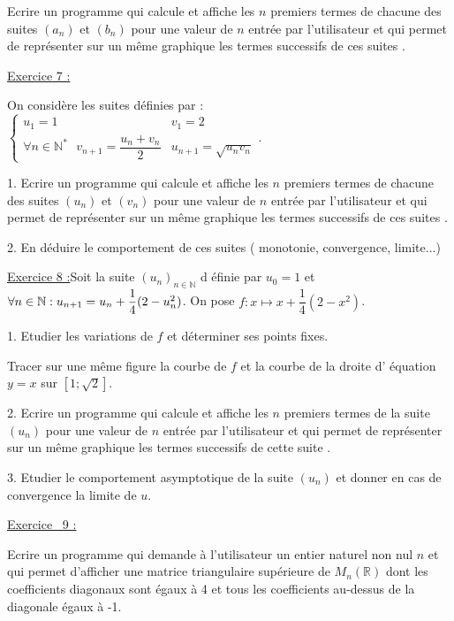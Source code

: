 \documentclass{article}
\begin{document}
Ecrire un programme qui calcule et affiche les $n$ premiers termes de
chacune des suites $\left( a_{n}\right) $ et $\left( b_{n}\right) $ pour une
valeur de $n$ entr\'{e}e par l'utilisateur et qui permet de repr\'{e}senter
sur un m\^{e}me graphique les termes successifs de ces suites .

\underline{Exercice 7 :}

On consid\`{e}re les suites d\'{e}finies par : $\left\{ 
\begin{array}{cc}
u_{1}=1 & v_{1}=2 \\ 
\forall n\in \mathbb{N}^{\ast }\text{ }v_{n+1}=\dfrac{u_{n}+v_{n}}{2} & 
u_{n+1}=\sqrt{u_{n}v_{n}}%
\end{array}%
\right. .$

1. Ecrire un programme qui calcule et affiche les $n$ premiers termes de
chacune des suites $\left( u_{n}\right) $ et $\left( v_{n}\right) $ pour une
valeur de $n$ entr\'{e}e par l'utilisateur et qui permet de repr\'{e}senter
sur un m\^{e}me graphique les termes successifs de ces suites .

2. En d\'{e}duire le comportement de ces suites ( monotonie, convergence,
limite...)

\bigskip

\bigskip \underline{Exercice 8 :}Soit la suite $(u_{n})_{n\in \mathbb{N}}$ d%
\'{e}finie par $u_{0}=1$ et $\forall n\in \mathbb{N}:u_{n+1}=u_{n}+\dfrac{1}{%
4}(2-u_{n}^{2})$. \newline
On pose $f:x\mapsto x+\dfrac{1}{4}(2-x^{2})$.\thinspace

1. Etudier les variations de $f$ et d\'{e}terminer ses points fixes.

Tracer sur une m\^{e}me figure la courbe de $f$ et la courbe de la droite d'%
\'{e}quation $y=x$ sur $\left[ 1;\sqrt{2}\right] .$

2. Ecrire un programme qui calcule et affiche les $n$ premiers termes de la
suite $\left( u_{n}\right) $ pour une valeur de $n$ entr\'{e}e par
l'utilisateur et qui permet de repr\'{e}senter sur un m\^{e}me graphique les
termes successifs de cette suite .

3. Etudier le comportement asymptotique de la suite $\left( u_{n}\right) $
et donner en cas de convergence la limite de $u.$

\underline{Exercice \ 9 :}

Ecrire un programme qui demande \`{a} l'utilisateur un entier naturel non
nul $n$ et qui permet d'afficher une matrice triangulaire sup\'{e}rieure de $%
M_{n}\left( 
\mathbb{R}
\right) $ dont les coefficients diagonaux sont \'{e}gaux \`{a} 4 et tous les
coefficients au-dessus de la diagonale \'{e}gaux \`{a} -1.

\bigskip
\end{document}
